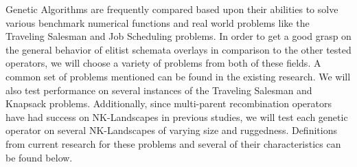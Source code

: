Genetic Algorithms are frequently compared based upon their abilities to solve various benchmark numerical functions and real world problems like the Traveling Salesman and Job Scheduling problems\cite{molga05}. In order to get a good grasp on the general behavior of elitist schemata overlays in comparison to the other tested operators, we will choose a variety of problems from both of these fields. 
A common set of problems mentioned can be found in the existing research\cite{Eiben95}\cite{Tsutsui99}\cite{Deb99}. We will also test performance on several instances of the Traveling Salesman and Knapsack problems. Additionally, since multi-parent recombination operators have had success on NK-Landscapes in previous studies, we will test each genetic operator on several NK-Landscapes of varying size and ruggedness\cite{Eiben96}\cite{Skellett05}. Definitions from current research for these problems and several of their characteristics can be found below\cite{molga05}\cite{yang10}.